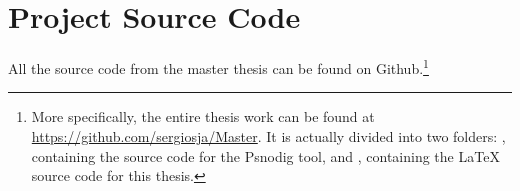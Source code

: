 
\section{Project Source Code}

All the source code from the master thesis can be found on Github.\footnote{More specifically, the entire thesis work can be found at \url{https://github.com/sergiosja/Master}. It is actually divided into two folders: , containing the source code for the Psnodig tool, and , containing the LaTeX source code for this thesis.}

